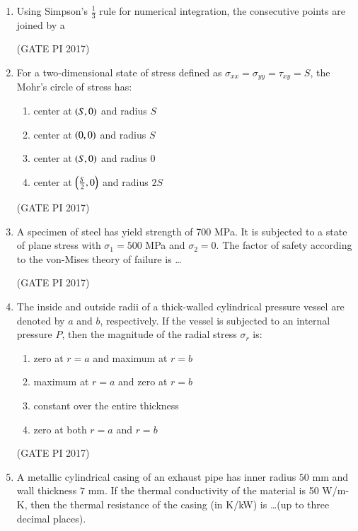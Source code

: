 \documentclass[journal,12pt,onecolumn]{IEEEtran}
\theoremstyle{remark}
\begin{document}
\begin{enumerate}
\item Using Simpson's $\frac{1}{3}$ rule for numerical integration, the consecutive points are joined by a
\begin{enumerate}
\end{enumerate}
\hfill (GATE PI 2017)

\item For a two-dimensional state of stress defined as $\sigma_{xx} = \sigma_{yy} = \tau_{xy} = S$, the Mohr's circle of stress has:
\begin{enumerate}
\item center at $\brak{S, 0}$ and radius $S$
\item center at $\brak{0, 0}$ and radius $S$
\item center at $\brak{S, 0}$ and radius $0$
\item center at $\brak{\frac{S}{2}, 0}$ and radius $2S$
\end{enumerate}
\hfill (GATE PI 2017)

\item A specimen of steel has yield strength of 700 MPa. It is subjected to a state of plane stress with $\sigma_1 = 500$ MPa and $\sigma_2 = 0$. The factor of safety according to the von-Mises theory of failure is \dots

\hfill (GATE PI 2017) 


\item The inside and outside radii of a thick-walled cylindrical pressure vessel are denoted by $a$ and $b$, respectively. If the vessel is subjected to an internal pressure $P$, then the magnitude of the radial stress $\sigma_r$ is:
\begin{enumerate}
\item zero at $r = a$ and maximum at $r = b$
\item maximum at $r = a$ and zero at $r = b$
\item constant over the entire thickness
\item zero at both $r = a$ and $r = b$
\end{enumerate}
\hfill (GATE PI 2017)

\item A metallic cylindrical casing of an exhaust pipe has inner radius $50$ mm and wall thickness $7$ mm. If the thermal conductivity of the material is 50 W/m-K, then the thermal resistance of the casing (in K/kW) is \dots (up to three decimal places).  


\end{enumerate}
\end{document}
